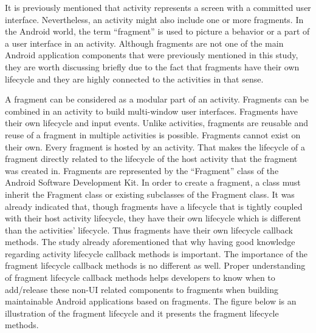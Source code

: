 It is previously mentioned that activity represents a screen with a committed user interface. Nevertheless, an activity might also include one or more fragments. In the Android world, the term “fragment” is used to picture a behavior or a part of a user interface in an activity. Although fragments are not one of the main Android application components that were previously mentioned in this study, they are worth discussing briefly due to the fact that fragments have their own lifecycle and they are highly connected to the activities in that sense. 

A fragment can be considered as a modular part of an activity. Fragments can be combined in an activity to build multi-window user interfaces. Fragments have their own lifecycle and input events. Unlike activities, fragments are reusable and reuse of a fragment in multiple activities is possible. Fragments cannot exist on their own. Every fragment is hosted by an activity. That makes the lifecycle of a fragment directly related to the lifecycle of the host activity that the fragment was created in. Fragments are represented by the “Fragment” class of the Android Software Development Kit. In order to create a fragment, a class must inherit the Fragment class or existing subclasses of the Fragment class. It was already indicated that, though fragments have a lifecycle that is tightly coupled with their host activity lifecycle, they have their own lifecycle which is different than the activities’ lifecycle. Thus fragments have their own lifecycle callback methods. The study already aforementioned that why having good knowledge regarding activity lifecycle callback methods is important. The importance of the fragment lifecycle callback methods is no different as well. Proper understanding of fragment lifecycle callback methods helps developers to know when to add/release these non-UI related components to fragments when building maintainable Android applications based on fragments. The figure below is an illustration of the fragment lifecycle and it presents the fragment lifecycle methods.
